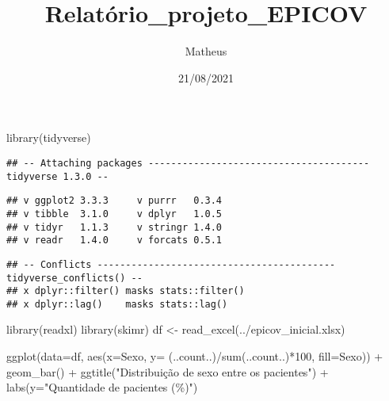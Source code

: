 \documentclass[
]{article}
\title{Relatório\_projeto\_EPICOV}
\author{Matheus}
\date{21/08/2021}
\newenvironment{Shaded}{\begin{snugshade}}{\end{snugshade}}
\newcommand{\AttributeTok}[1]{\textcolor[rgb]{0.77,0.63,0.00}{#1}}
\newcommand{\DecValTok}[1]{\textcolor[rgb]{0.00,0.00,0.81}{#1}}
\newcommand{\FunctionTok}[1]{\textcolor[rgb]{0.00,0.00,0.00}{#1}}
\newcommand{\NormalTok}[1]{#1}
\newcommand{\OtherTok}[1]{\textcolor[rgb]{0.56,0.35,0.01}{#1}}
\newcommand{\SpecialCharTok}[1]{\textcolor[rgb]{0.00,0.00,0.00}{#1}}
\newcommand{\StringTok}[1]{\textcolor[rgb]{0.31,0.60,0.02}{#1}}
\begin{document}
\maketitle

\begin{Shaded}
\begin{Highlighting}[]
\FunctionTok{library}\NormalTok{(tidyverse)}
\end{Highlighting}
\end{Shaded}

\begin{verbatim}
## -- Attaching packages --------------------------------------- tidyverse 1.3.0 --
\end{verbatim}

\begin{verbatim}
## v ggplot2 3.3.3     v purrr   0.3.4
## v tibble  3.1.0     v dplyr   1.0.5
## v tidyr   1.1.3     v stringr 1.4.0
## v readr   1.4.0     v forcats 0.5.1
\end{verbatim}

\begin{verbatim}
## -- Conflicts ------------------------------------------ tidyverse_conflicts() --
## x dplyr::filter() masks stats::filter()
## x dplyr::lag()    masks stats::lag()
\end{verbatim}

\begin{Shaded}
\begin{Highlighting}[]
\FunctionTok{library}\NormalTok{(readxl)}
\FunctionTok{library}\NormalTok{(skimr)}
\NormalTok{df }\OtherTok{\textless{}{-}} \FunctionTok{read\_excel}\NormalTok{(}\StringTok{\textquotesingle{}../epicov\_inicial.xlsx\textquotesingle{}}\NormalTok{)}
\end{Highlighting}
\end{Shaded}

\begin{Shaded}
\begin{Highlighting}[]
\FunctionTok{ggplot}\NormalTok{(}\AttributeTok{data=}\NormalTok{df, }\FunctionTok{aes}\NormalTok{(}\AttributeTok{x=}\NormalTok{Sexo, }\AttributeTok{y=}\NormalTok{ (..count..)}\SpecialCharTok{/}\FunctionTok{sum}\NormalTok{(..count..)}\SpecialCharTok{*}\DecValTok{100}\NormalTok{, }\AttributeTok{fill=}\NormalTok{Sexo)) }\SpecialCharTok{+} 
  \FunctionTok{geom\_bar}\NormalTok{() }\SpecialCharTok{+}
  \FunctionTok{ggtitle}\NormalTok{(}\StringTok{"Distribuição de sexo entre os pacientes"}\NormalTok{) }\SpecialCharTok{+}
  \FunctionTok{labs}\NormalTok{(}\AttributeTok{y=}\StringTok{"Quantidade de pacientes (\%)"}\NormalTok{)}
\end{Highlighting}
\end{Shaded}
\end{document}
